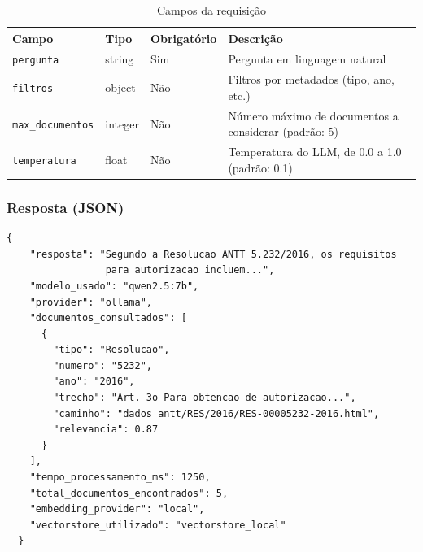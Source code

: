 \documentclass[12pt, a4paper]{article}
\begin{document}
\begin{table}[H]
\centering
\small
\caption{Campos da requisição}
\label{tab:req_campos}
\begin{tabularx}{\textwidth}{l l l X}
\toprule
\textbf{Campo} & \textbf{Tipo} & \textbf{Obrigatório} & \textbf{Descrição} \\
\midrule
\texttt{pergunta} & string & Sim & Pergunta em linguagem natural \\
\texttt{filtros} & object & Não & Filtros por metadados (tipo, ano, etc.) \\
\texttt{max\_documentos} & integer & Não & Número máximo de documentos a considerar (padrão: 5) \\
\texttt{temperatura} & float & Não & Temperatura do LLM, de 0.0 a 1.0 (padrão: 0.1) \\
\bottomrule
\end{tabularx}
\end{table}

\subsubsection*{Resposta (JSON)}

\begin{lstlisting}[caption={Corpo da resposta do endpoint /api/query}, label=lst:response]
  {
    "resposta": "Segundo a Resolucao ANTT 5.232/2016, os requisitos
                 para autorizacao incluem...",
    "modelo_usado": "qwen2.5:7b",
    "provider": "ollama",
    "documentos_consultados": [
      {
        "tipo": "Resolucao",
        "numero": "5232",
        "ano": "2016",
        "trecho": "Art. 3o Para obtencao de autorizacao...",
        "caminho": "dados_antt/RES/2016/RES-00005232-2016.html",
        "relevancia": 0.87
      }
    ],
    "tempo_processamento_ms": 1250,
    "total_documentos_encontrados": 5,
    "embedding_provider": "local",
    "vectorstore_utilizado": "vectorstore_local"
  }
\end{lstlisting}
\end{document}
